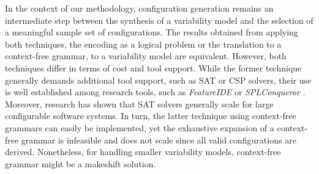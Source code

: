 In the context of our methodology, configuration generation remains an
intermediate step between the synthesis of a variability model and the
selection of a meaningful sample set of configurations. The results obtained
from applying both techniques, the encoding as a logical problem or the
translation to a context-free grammar,  to a variability model are equivalent.
However, both techniques differ in terms of cost and tool support. While the
former technique generally demands additional tool support, such as SAT or CSP
solvers, their use is well established among research tools, such as
\emph{FeatureIDE} \citep{al-hajjaji_incling:_2016} or \emph{SPLConqueror}
\citep{siegmund_predicting_2012}. Moreover, research has shown that SAT solvers
generally scale for large configurable software systems. 
In turn, the latter technique using context-free grammars can easily be implemented, yet the exhaustive expansion
of a context-free grammar is infeasible and does not scale since all valid
configurations are derived. Nonetheless, for handling smaller variability
models, context-free grammar might be a makeshift solution.
 

